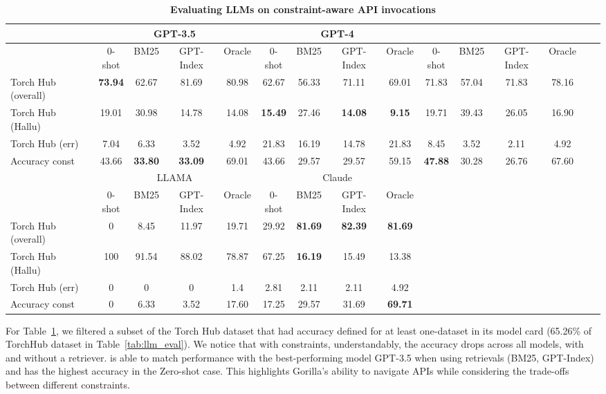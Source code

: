 \begin{table}[h]
    \caption{\small \textbf{Evaluating LLMs on constraint-aware API invocations}
    }
    \label{tab:const}
    \begin{adjustbox}{max width=\textwidth}
    \begin{tabular}{l cccc|cccc|cccccc}
    \toprule
    & \multicolumn{4}{c}{GPT-3.5} & \multicolumn{4}{c}{GPT-4} & \multicolumn{4}{c}{\oursmethod{}}\\ 
     \midrule
    & 0-shot & BM25 & GPT-Index & Oracle & 0-shot & BM25 & GPT-Index & Oracle & 0-shot & BM25 & GPT-Index & Oracle \\
    \midrule
    Torch Hub (overall) &  \textbf{73.94} & 62.67 & 81.69 & 80.98 & 62.67 & 56.33 & 71.11 & 69.01  & 71.83 & 57.04 & 71.83 & 78.16 \\
    Torch Hub (Hallu) &  19.01 & 30.98 & 14.78 & 14.08 & \textbf{15.49} & 27.46 & \textbf{14.08} & \textbf{9.15} & 19.71 & 39.43 & 26.05 & 16.90 \\
    Torch Hub (err) &  7.04 & 6.33 & 3.52 & 4.92 & 21.83 & 16.19 & 14.78 & 21.83 & 8.45 & 3.52 & 2.11 & 4.92 \\
    \midrule
    Accuracy const & 43.66 & \textbf{33.80} & \textbf{33.09} & 69.01 & 43.66 & 29.57 & 29.57 & 59.15 & \textbf{47.88} & 30.28 & 26.76 & 67.60\\
    \midrule
    & \multicolumn{4}{c}{LLAMA} & \multicolumn{4}{c}{Claude}\\ 
     \midrule
    & 0-shot & BM25 & GPT-Index & Oracle & 0-shot & BM25 & GPT-Index & Oracle  \\
    \cmidrule{1-9}
    Torch Hub (overall) &  0 & 8.45 & 11.97 & 19.71 & 29.92 & \textbf{81.69} & \textbf{82.39} & \textbf{81.69}\\
    Torch Hub (Hallu) &   100 & 91.54 & 88.02 & 78.87 & 67.25 & \textbf{16.19} & 15.49 & 13.38\\
    Torch Hub (err) &  0 & 0 & 0 & 1.4  & 2.81 & 2.11 & 2.11 & 4.92\\
     \cmidrule{1-9}
    Accuracy const & 0 & 6.33 & 3.52 & 17.60 & 17.25 & 29.57 & 31.69 & \textbf{69.71}\\
    \bottomrule
    \end{tabular}
    \end{adjustbox}
\end{table}

For Table~\ref{tab:const}, we filtered a subset of the Torch Hub dataset that had accuracy defined for at least one-dataset in its model card (65.26\% of TorchHub dataset in Table~\ref{tab:llm_eval}). We notice that with constraints, understandably, the accuracy drops across all models, with and without a retriever. \gorilla{} is able to match performance with the best-performing model GPT-3.5 when using retrievals (BM25, GPT-Index) and has the highest accuracy in the Zero-shot case. This highlights Gorilla's ability to navigate APIs while considering the trade-offs between different constraints. 


